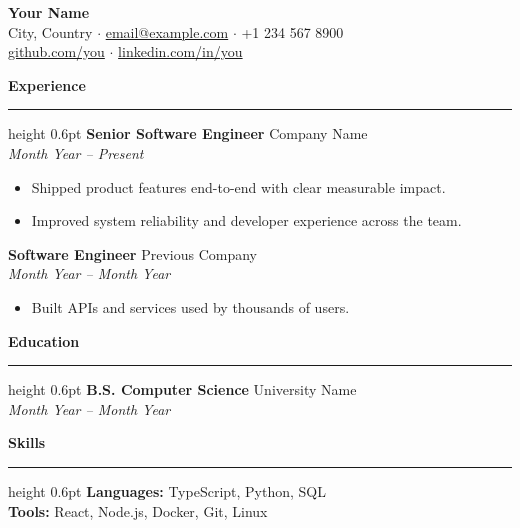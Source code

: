 \documentclass[11pt,a4paper]{article}
\newcommand{\sectionrule}{\vspace{2pt}\hrule height 0.6pt\vspace{6pt}}
\begin{document}
{\LARGE\bfseries Your Name}\\[6pt]
{\small City, Country $\cdot$
\href{mailto:email@example.com}{email@example.com} $\cdot$
+1 234 567 8900}\\[2pt]
{\small
\href{https://github.com/}{github.com/you} $\cdot$
\href{https://linkedin.com/in/}{linkedin.com/in/you}}

\vspace{10pt}

{\large\bfseries Experience}\sectionrule
\textbf{Senior Software Engineer} \hfill Company Name\\
\textit{Month Year -- Present}
\begin{itemize}
  \item Shipped product features end-to-end with clear measurable impact.
  \item Improved system reliability and developer experience across the team.
\end{itemize}

\textbf{Software Engineer} \hfill Previous Company\\
\textit{Month Year -- Month Year}
\begin{itemize}
  \item Built APIs and services used by thousands of users.
\end{itemize}

{\large\bfseries Education}\sectionrule
\textbf{B.S. Computer Science} \hfill University Name\\
\textit{Month Year -- Month Year}

{\large\bfseries Skills}\sectionrule
\textbf{Languages:} TypeScript, Python, SQL\\
\textbf{Tools:} React, Node.js, Docker, Git, Linux
\end{document}
